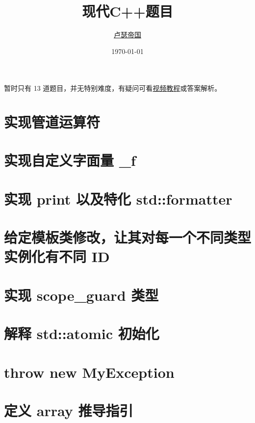 \documentclass[11pt,fancyhdr]{ctexart}
\title{现代C++题目}
\author{\href{https://github.com/Mq-b/Loser-HomeWork}{卢瑟帝国}\\}
\date{\today}
\begin{document}
\maketitle

\tableofcontents
\newpage

暂时只有 13 道题目，并无特别难度，有疑问可看\href{https://www.bilibili.com/video/BV1Zj411r7eP/}{视频教程}或答案解析。


\section{实现管道运算符}


\section{实现自定义字面量 \_f}

\section{实现 print 以及特化 std::formatter}



\section{给定模板类修改，让其对每一个不同类型实例化有不同 ID}


\section{实现 scope\_guard 类型}


\section{解释 std::atomic 初始化}


\section{throw new MyException}


\section{定义 array 推导指引}

\end{document}
